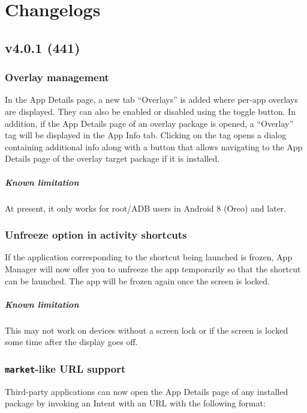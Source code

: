 \chapter{Changelogs}\label{ch:changelogs} %

\section{v4.0.1 (441)}\label{sec:v4.0.1-(441)}
\subsection{Overlay management}
In the App Details page, a new tab ``Overlays'' is added where per-app overlays are displayed. They
can also be enabled or disabled using the toggle button. In addition, if the App Details page of an
overlay package is opened, a ``Overlay'' tag will be displayed in the App Info tab. Clicking on the
tag opens a dialog containing additional info along with a button that allows navigating to the
App Details page of the overlay target package if it is installed.

\paragraph{Known limitation} At present, it only works for root/ADB users in Android 8 (Oreo) and
later.

\subsection{Unfreeze option in activity shortcuts}
If the application corresponding to the shortcut being launched is frozen, App Manager will now
offer you to unfreeze the app temporarily so that the shortcut can be launched. The app will be
frozen again once the screen is locked.

\paragraph{Known limitation} This may not work on devices without a screen lock or if the screen is
locked some time after the display goes off.

\subsection{\texttt{market}-like URL support}
Third-party applications can now open the App Details page of any installed package by invoking an
Intent with an URL with the following format:

